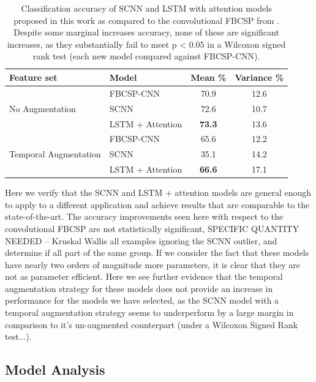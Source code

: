 \documentclass[utf8]{frontiersSCNS} %
\begin{document}
\begin{table}[t]
  \centering
  \label{tab:end2end_results}
  \begin{tabular}{l l | c | c}
    \toprule
    \textbf{Feature set} & \textbf{Model} & \textbf{Mean \%} & \textbf{Variance \%} \\
    \toprule
    \multirow{3}{*}{No Augmentation}
                         & FBCSP-CNN           & 70.9 & 12.6  \\
                         & SCNN                & 72.6 & 10.7  \\
                         & LSTM + Attention    & \textbf{73.3} & 13.6  \\ 
    \midrule
    \multirow{3}{*}{Temporal Augmentation}
                         & FBCSP-CNN           & 65.6 & 12.2  \\
                         & SCNN                & 35.1 & 14.2  \\
                         & LSTM + Attention    & \textbf{66.6} & 17.1  \\ 
    \bottomrule
  \end{tabular}
  \caption{Classification accuracy of SCNN and LSTM with attention models proposed in this work as compared to the convolutional FBCSP from \cite{Schirrmeister2017}. Despite some marginal increases accuracy, none of these are significant increases, as they substantially fail to meet p < 0.05 in a Wilcoxon signed rank test (each new model compared against FBCSP-CNN).}
\end{table}

Here we verify that the SCNN and LSTM + attention models are general enough to apply to a different application and achieve results that are comparable to the state-of-the-art. The accuracy improvements seen here with respect to the convolutional FBCSP are not statistically significant, SPECIFIC QUANTITY NEEDED -- Kruskal Wallis all examples ignoring the SCNN outlier, and determine if all part of the same group. If we consider the fact that these models have nearly two orders of magnitude more parameters, it is clear that they are not as parameter efficient. Here we see further evidence that the temporal augmentation strategy for these models does not provide an increase in performance for the models we have selected, as the SCNN model with a temporal augmentation strategy seems to underperform by a large margin in comparison to it's un-augmented counterpart (under a Wilcoxon Signed Rank test...).

\subsection{Model Analysis}
\end{document}
